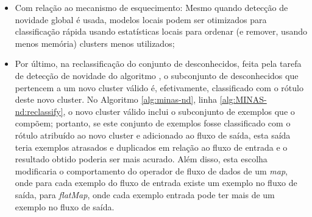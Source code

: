 \begin{itemize}
\begin{itemize}
  \end{itemize}
    
  \item Com relação ao mecanismo de esquecimento:
  Mesmo quando detecção de novidade global é usada, modelos locais podem
  ser otimizados para classificação rápida usando estatísticas locais para
  ordenar (e remover, usando menos memória) clusters menos utilizados;

  \item Por último, na reclassificação do conjunto de desconhecidos,
  feita pela tarefa de detecção de novidade do algoritmo \minas, o subconjunto de
  desconhecidos que pertencem a um novo cluster válido é, efetivamente,
  classificado com o rótulo deste novo cluster.
  No Algoritmo \ref{alg:minas-nd}, linha \ref{alg:MINAS-nd:reclassify},
  o novo cluster válido inclui o subconjunto de exemplos que o compõem;
  portanto, se este conjunto de exemplos fosse classificado com o rótulo atribuído ao
  novo cluster e adicionado ao fluxo de saída, esta saída teria exemplos
  atrasados e duplicados em relação ao fluxo de entrada e o resultado obtido
  poderia ser mais acurado.
  Além disso, esta escolha modificaria o comportamento do operador de fluxo de
  dados de um \emph{map}, onde para cada exemplo do fluxo de entrada existe um
  exemplo no fluxo de saída, para \emph{flatMap}, onde cada exemplo entrada pode
  ter mais de um exemplo no fluxo de saída.

\end{itemize}


